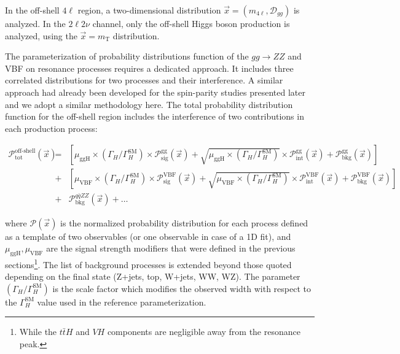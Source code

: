 In the off-shell $4\ell$ region, a two-dimensional distribution $\vec{x}=(m_{4\ell}, \mathcal{D}_{gg})$
is analyzed. In the $2\ell2\nu$ channel, only the off-shell Higgs boson production is analyzed,
using the $\vec{x}=m_\mathrm{T}$ distribution.

The parameterization of probability distributions function of the $gg\to ZZ$ and VBF on resonance processes requires a dedicated 
approach. It includes three correlated distributions for two processes and their interference. A similar 
approach had already been developed for the spin-parity studies presented later and we adopt a similar methodology here. The total probability distribution function for the off-shell region includes the interference of two
contributions in each production process:
 
 \begin{eqnarray}
 \mathcal{P}_\text{tot}^\text{off-shell}(\vec{x})  &=&
\left[\mu_{\text{ggH}}\times\left(\Gamma_{H}/\Gamma_{H}^{\textrm{SM}}\right) \times \mathcal{P}^{\text{gg}}_\text{sig}\left(\vec{x}\right) +  \sqrt{\mu_{\text{ggH}}\times\left(\Gamma_{H}/\Gamma_{H}^{\textrm{SM}}\right)} \times  \mathcal{P}^{\text{gg}}_\text{int}(\vec{x})+ \mathcal{P}^{\text{gg}}_\text{bkg}(\vec{x}) \right] \nonumber \\
  &+& \left[\mu_{\text{VBF}}\times\left(\Gamma_{H}/\Gamma_{H}^{\textrm{SM}}\right) \times \mathcal{P}^{\text{VBF}}_\text{sig}\left(\vec{x}\right) +  \sqrt{\mu_{\text{VBF}}\times\left(\Gamma_{H}/\Gamma_{H}^{\textrm{SM}}\right)} \times  \mathcal{P}^{\text{VBF}}_\text{int}(\vec{x})+ \mathcal{P}^{\text{VBF}}_\text{bkg}(\vec{x}) \right] \nonumber \\
  &+& \mathcal{P}^{q\bar{q}ZZ}_\text{bkg}(\vec{x}) + \ldots
\label{eq:pdf-prob-vbf}
\end{eqnarray}

where $\mathcal{P}\left(\vec{x}\right)$ is the normalized probability distribution for each process
defined as a template of two observables (or one observable in case of a 1D fit), and $\mu_{\text{ggH}}, \mu_{\text{VBF}}$ are the signal strength modifiers that were defined in the previous sections\footnote{While the $t\bar{t}H$ and $VH$ components are negligible away from the resonance peak.}. The list of background processes is extended beyond those quoted depending on the final state (Z+jets, top, W+jets, WW, WZ). The parameter $(\Gamma_{H}/\Gamma_{H}^{\text{SM}})$ is the scale factor which modifies the observed width with respect to the $\Gamma_{H}^{\text{SM}}$ value used in the reference parameterization.

